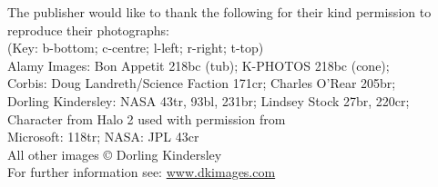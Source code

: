 \documentclass[10pt]{article}
\begin{document}
The publisher would like to thank the following for their kind permission to reproduce their photographs:\\
(Key: b-bottom; c-centre; l-left; r-right; t-top)\\
Alamy Images: Bon Appetit 218bc (tub); K-PHOTOS 218bc (cone);\\
Corbis: Doug Landreth/Science Faction 171cr; Charles O'Rear 205br;\\
Dorling Kindersley: NASA 43tr, 93bl, 231br; Lindsey Stock 27br, 220cr; Character from Halo 2 used with permission from\\
Microsoft: 118tr; NASA: JPL 43cr\\
All other images © Dorling Kindersley\\
For further information see: \href{http://www.dkimages.com}{www.dkimages.com}
\end{document}
